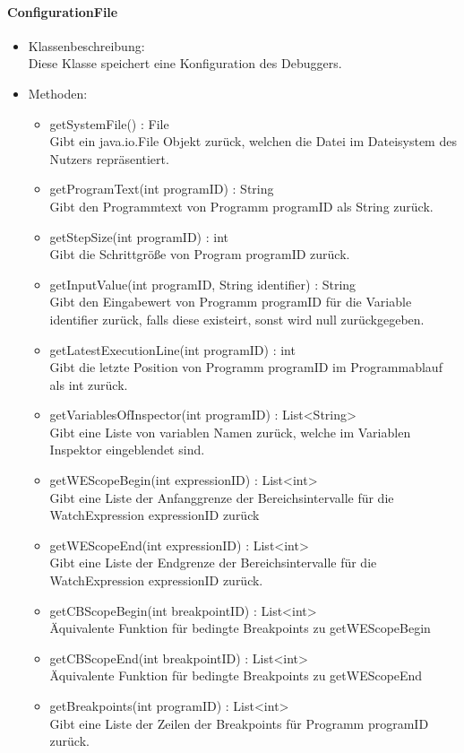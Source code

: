 \documentclass[parskip=full]{scrartcl}
\begin{document}
\paragraph{ConfigurationFile}
\begin{itemize}
\item Klassenbeschreibung: \\
Diese Klasse speichert eine Konfiguration des Debuggers.
\item Methoden: \\
\begin{itemize}
\item getSystemFile() : File \\
Gibt ein java.io.File Objekt zurück, welchen die Datei im Dateisystem des Nutzers repräsentiert.
\item getProgramText(int programID) : String \\
Gibt den Programmtext von Programm programID als String zurück.
\item getStepSize(int programID) : int \\
Gibt die Schrittgröße von Program programID zurück.
\item getInputValue(int programID, String identifier) : String \\
Gibt den Eingabewert von Programm programID für die Variable identifier zurück, falls diese existeirt,
sonst wird null zurückgegeben.
\item getLatestExecutionLine(int programID) : int \\
Gibt die letzte Position von Programm programID im Programmablauf als int zurück. %
\item getVariablesOfInspector(int programID) : List<String> \\
Gibt eine Liste von variablen Namen zurück, welche im Variablen Inspektor eingeblendet sind.
\item getWEScopeBegin(int expressionID) : List<int> \\
Gibt eine Liste der Anfanggrenze der Bereichsintervalle für die WatchExpression expressionID zurück
\item getWEScopeEnd(int expressionID) : List<int> \\
Gibt eine Liste der Endgrenze der Bereichsintervalle für die WatchExpression expressionID zurück.
\item getCBScopeBegin(int breakpointID) : List<int> \\
Äquivalente Funktion für bedingte Breakpoints zu getWEScopeBegin
\item getCBScopeEnd(int breakpointID) : List<int> \\
Äquivalente Funktion für bedingte Breakpoints zu getWEScopeEnd
\item getBreakpoints(int programID) : List<int> \\
Gibt eine Liste der Zeilen der Breakpoints für Programm programID zurück.
\end{itemize}
\end{itemize}
\end{document}
